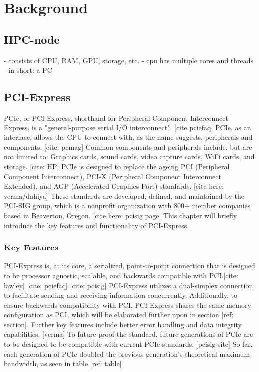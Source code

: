 
\chapter{Background}\label{chapter:Background}

\section{HPC-node}

- consists of CPU, RAM, GPU, storage, etc.
- cpu has multiple cores and threads
- in short: a PC

\section{PCI-Express}
PCIe, or PCI-Express, shorthand for Peripheral Component Interconnect Express, is a "general-purpose serial I/O interconnect". [cite pciefaq] PCIe, as an interface, allows the CPU to connect with, as the name suggests, peripherals and components. [cite: pcmag] Common components and peripherals include, but are not limited to: Graphics cards, sound cards, video capture cards, WiFi cards, and storage. [cite: HP]
PCIe is designed to replace the ageing PCI (Peripheral Component Interconnect), PCI-X (Peripheral Component Interconnect Extended), and AGP (Accelerated Graphics Port) standards. [cite here: verma/dahiya] These standards are developed, defined, and maintained by the PCI-SIG group, which is a nonprofit organization with 800+ member companies based in Beaverton, Oregon. [cite here: pcisig page] This chapter will briefly introduce the key features and functionality of PCI-Express.

\subsection{Key Features}

PCI-Express is, at its core, a serialized, point-to-point connection that is designed to be processor agnostic, scalable, and backwards compatible with PCI.[cite: lawley] [cite: pciefaq] [cite: pcisig] PCI-Express utilizes a dual-simplex connection to facilitate sending and receiving information concurrently. Additionally, to ensure backwards compatibility with PCI, PCI-Express shares the same memory configuration as PCI, which will be elaborated further upon in section [ref: section]. Further key features include better error handling and data integrity capabilities. [verma] To future-proof the standard, future generations of PCIe are to be designed to be compatible with current PCIe standards. [pcisig site] So far, each generation of PCIe doubled the previous generation's theoretical maximum bandwidth, as seen in table [ref: table]

